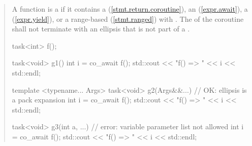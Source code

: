 \begin{quote}
\pnum
A function is a  if it contains a  (\ref{stmt.return.coroutine}),  an  (\ref{expr.await}), a  (\ref{expr.yield}), or a range-based  (\ref{stmt.ranged}) with .
The  of the coroutine shall not terminate with an ellipsis that is not part of a . 




\pnum
\enterexample
\begin{codeblock}
  task<int> f();
  
  task<void> g1() {
    int i = co_await f();
    std::cout << "f() => " << i << std::endl;
  }

  template <typename... Args>
  task<void> g2(Args&&...) { // OK: ellipsis is a pack expansion
    int i = co_await f();
    std::cout << "f() => " << i << std::endl;
  }

  task<void> g3(int a, ...) { // error: variable parameter list not allowed
    int i = co_await f();
    std::cout << "f() => " << i << std::endl;
  }

\end{codeblock}
\exitexample
%
%  
%    



\end{quote}
